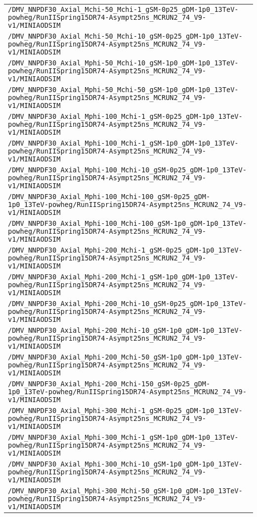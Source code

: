 \begin{center}
\begin{tabular}{l}
\verb!/DMV_NNPDF30_Axial_Mchi-50_Mchi-1_gSM-0p25_gDM-1p0_13TeV-powheg/RunIISpring15DR74-Asympt25ns_MCRUN2_74_V9-v1/MINIAODSIM! \tabularnewline
\verb!/DMV_NNPDF30_Axial_Mchi-50_Mchi-10_gSM-0p25_gDM-1p0_13TeV-powheg/RunIISpring15DR74-Asympt25ns_MCRUN2_74_V9-v1/MINIAODSIM! \tabularnewline
\verb!/DMV_NNPDF30_Axial_Mphi-50_Mchi-10_gSM-1p0_gDM-1p0_13TeV-powheg/RunIISpring15DR74-Asympt25ns_MCRUN2_74_V9-v1/MINIAODSIM! \tabularnewline
\verb!/DMV_NNPDF30_Axial_Mphi-50_Mchi-50_gSM-1p0_gDM-1p0_13TeV-powheg/RunIISpring15DR74-Asympt25ns_MCRUN2_74_V9-v1/MINIAODSIM! \tabularnewline
\verb!/DMV_NNPDF30_Axial_Mphi-100_Mchi-1_gSM-0p25_gDM-1p0_13TeV-powheg/RunIISpring15DR74-Asympt25ns_MCRUN2_74_V9-v1/MINIAODSIM! \tabularnewline
\verb!/DMV_NNPDF30_Axial_Mphi-100_Mchi-1_gSM-1p0_gDM-1p0_13TeV-powheg/RunIISpring15DR74-Asympt25ns_MCRUN2_74_V9-v1/MINIAODSIM! \tabularnewline
\verb!/DMV_NNPDF30_Axial_Mphi-100_Mchi-10_gSM-0p25_gDM-1p0_13TeV-powheg/RunIISpring15DR74-Asympt25ns_MCRUN2_74_V9-v1/MINIAODSIM! \tabularnewline
\verb!/DMV_NNPDF30_Axial_Mphi-100_Mchi-100_gSM-0p25_gDM-1p0_13TeV-powheg/RunIISpring15DR74-Asympt25ns_MCRUN2_74_V9-v1/MINIAODSIM! \tabularnewline
\verb!/DMV_NNPDF30_Axial_Mphi-100_Mchi-100_gSM-1p0_gDM-1p0_13TeV-powheg/RunIISpring15DR74-Asympt25ns_MCRUN2_74_V9-v1/MINIAODSIM! \tabularnewline
\verb!/DMV_NNPDF30_Axial_Mphi-200_Mchi-1_gSM-0p25_gDM-1p0_13TeV-powheg/RunIISpring15DR74-Asympt25ns_MCRUN2_74_V9-v1/MINIAODSIM! \tabularnewline
\verb!/DMV_NNPDF30_Axial_Mphi-200_Mchi-1_gSM-1p0_gDM-1p0_13TeV-powheg/RunIISpring15DR74-Asympt25ns_MCRUN2_74_V9-v1/MINIAODSIM! \tabularnewline
\verb!/DMV_NNPDF30_Axial_Mphi-200_Mchi-10_gSM-0p25_gDM-1p0_13TeV-powheg/RunIISpring15DR74-Asympt25ns_MCRUN2_74_V9-v1/MINIAODSIM! \tabularnewline
\verb!/DMV_NNPDF30_Axial_Mphi-200_Mchi-10_gSM-1p0_gDM-1p0_13TeV-powheg/RunIISpring15DR74-Asympt25ns_MCRUN2_74_V9-v1/MINIAODSIM! \tabularnewline
\verb!/DMV_NNPDF30_Axial_Mphi-200_Mchi-50_gSM-1p0_gDM-1p0_13TeV-powheg/RunIISpring15DR74-Asympt25ns_MCRUN2_74_V9-v1/MINIAODSIM! \tabularnewline
\verb!/DMV_NNPDF30_Axial_Mphi-200_Mchi-150_gSM-0p25_gDM-1p0_13TeV-powheg/RunIISpring15DR74-Asympt25ns_MCRUN2_74_V9-v1/MINIAODSIM! \tabularnewline
\verb!/DMV_NNPDF30_Axial_Mphi-300_Mchi-1_gSM-0p25_gDM-1p0_13TeV-powheg/RunIISpring15DR74-Asympt25ns_MCRUN2_74_V9-v1/MINIAODSIM! \tabularnewline
\verb!/DMV_NNPDF30_Axial_Mphi-300_Mchi-1_gSM-1p0_gDM-1p0_13TeV-powheg/RunIISpring15DR74-Asympt25ns_MCRUN2_74_V9-v1/MINIAODSIM! \tabularnewline
\verb!/DMV_NNPDF30_Axial_Mphi-300_Mchi-10_gSM-1p0_gDM-1p0_13TeV-powheg/RunIISpring15DR74-Asympt25ns_MCRUN2_74_V9-v1/MINIAODSIM! \tabularnewline
\verb!/DMV_NNPDF30_Axial_Mphi-300_Mchi-50_gSM-1p0_gDM-1p0_13TeV-powheg/RunIISpring15DR74-Asympt25ns_MCRUN2_74_V9-v1/MINIAODSIM! \tabularnewline

\end{tabular}
\end{center}
